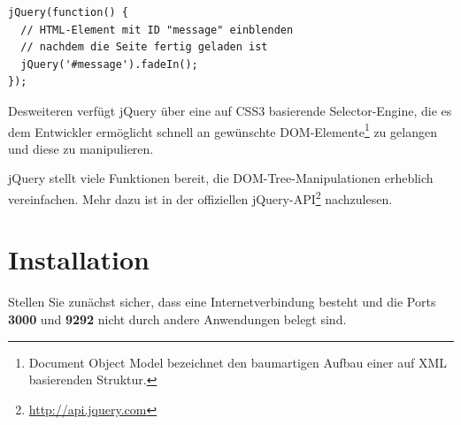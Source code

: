 \documentclass[10pt,a4paper]{book}
\begin{document}
\begin{lstlisting}
jQuery(function() {
  // HTML-Element mit ID "message" einblenden
  // nachdem die Seite fertig geladen ist
  jQuery('#message').fadeIn();
});
\end{lstlisting}

Desweiteren verfügt jQuery über eine auf CSS3 basierende Selector-Engine, die es dem Entwickler ermöglicht schnell an gewünschte DOM-Elemente\footnote{Document Object Model bezeichnet den baumartigen Aufbau einer auf XML basierenden Struktur.} zu gelangen und diese zu manipulieren.

jQuery stellt viele Funktionen bereit, die DOM-Tree-Manipulationen erheblich vereinfachen. Mehr dazu ist in der offiziellen jQuery-API\footnote{\href{http://api.jquery.com}{http://api.jquery.com}} nachzulesen.

\chapter{Installation}
Stellen Sie zunächst sicher, dass eine Internetverbindung besteht und die Ports \textbf{3000} und \textbf{9292} nicht durch andere Anwendungen belegt sind.
\end{document}
